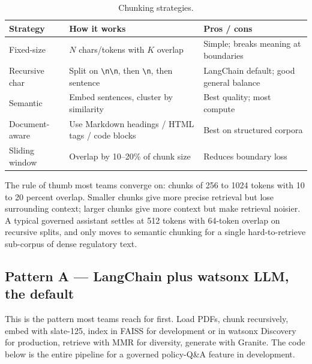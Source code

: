 \begin{table}[h]
\centering
\small
\begin{tabularx}{\textwidth}{l X X}
\toprule
\textbf{Strategy} & \textbf{How it works} & \textbf{Pros / cons} \\
\midrule
Fixed-size         & $N$ chars/tokens with $K$ overlap               & Simple; breaks meaning at boundaries \\
Recursive char     & Split on \texttt{\textbackslash n\textbackslash n}, then \texttt{\textbackslash n}, then sentence & LangChain default; good general balance \\
Semantic           & Embed sentences, cluster by similarity          & Best quality; most compute \\
Document-aware     & Use Markdown headings / HTML tags / code blocks & Best on structured corpora \\
Sliding window     & Overlap by 10--20\% of chunk size               & Reduces boundary loss \\
\bottomrule
\end{tabularx}
\caption{Chunking strategies.}
\label{tab:chunking}
\end{table}

The rule of thumb most teams converge on: chunks of 256 to 1024 tokens with 10 to 20 percent overlap. Smaller chunks give more precise retrieval but lose surrounding context; larger chunks give more context but make retrieval noisier. A typical governed assistant settles at 512 tokens with 64-token overlap on recursive splits, and only moves to semantic chunking for a single hard-to-retrieve sub-corpus of dense regulatory text.

\subsection{Pattern A --- LangChain plus watsonx LLM, the default}

This is the pattern most teams reach for first. Load PDFs, chunk recursively, embed with slate-125, index in FAISS for development or in watsonx Discovery for production, retrieve with MMR for diversity, generate with Granite. The code below is the entire pipeline for a governed policy-Q\&A feature in development.

